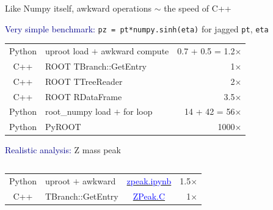 \documentclass[aspectratio=169]{beamer}
\begin{document}
\begin{frame}{Like Numpy itself, awkward operations $\sim$ the speed of C++}
\large
\vspace{0.35 cm}

\textcolor{darkblue}{Very simple benchmark:} \texttt{pz = pt*numpy.sinh(eta)} for jagged \texttt{pt}, \texttt{eta}

\begin{center}
\renewcommand{\arraystretch}{1.25}
\begin{tabular}{c l r}
\hline Python & uproot load $+$ awkward compute & 0.7 + 0.5 = 1.2$\times$ \\
C++ & ROOT TBranch::GetEntry & \phantom{0.7 + 0.5 =} 1$\times$\phantom{.0} \\
C++ & ROOT TTreeReader & \phantom{0.7 + 0.5 =} 2$\times$\phantom{.0} \\
C++ & ROOT RDataFrame & \phantom{0.7 + 0.5 =} 3.5$\times$ \\
Python & root\_numpy load $+$ for loop & 14 + 42 = 56$\times$\phantom{.0} \\
Python & PyROOT & \phantom{0.7 + 0.5 =} 1000$\times$\phantom{.0} \\ \hline
\end{tabular}
\end{center}

\vspace{0.25 cm}
\textcolor{darkblue}{Realistic analysis:} Z mass peak

\vspace{-0.5 cm}
\begin{columns}
\renewcommand{\arraystretch}{1.25}
\begin{tabular}{c l c r}
\hline Python & uproot $+$ awkward & \href{https://github.com/nsmith-/coffea/blob/master/notebooks/zpeak.ipynb}{\textcolor{blue}{zpeak.ipynb}} & 1.5$\times$ \\
C++ & TBranch::GetEntry & \href{https://github.com/nsmith-/coffea/blob/master/notebooks/ZPeak.C}{\textcolor{blue}{ZPeak.C}} & 1$\times$\phantom{.0} \\ \hline
\end{tabular}


\end{columns}
\end{frame}
\end{document}
